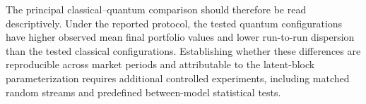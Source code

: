 \documentclass[aps,floatfix,superscriptaddress,twocolumn,tightenlines,amsmath,amssymb,nofootinbib,10pt,longbibliography,prl]{revtex4-2}
\begin{document}
The principal classical--quantum comparison should therefore be read descriptively. Under the reported protocol, the tested quantum configurations have higher observed mean final portfolio values and lower run-to-run dispersion than the tested classical configurations. Establishing whether these differences are reproducible across market periods and attributable to the latent-block parameterization requires additional controlled experiments, including matched random streams and predefined between-model statistical tests.

% 


\end{document}
